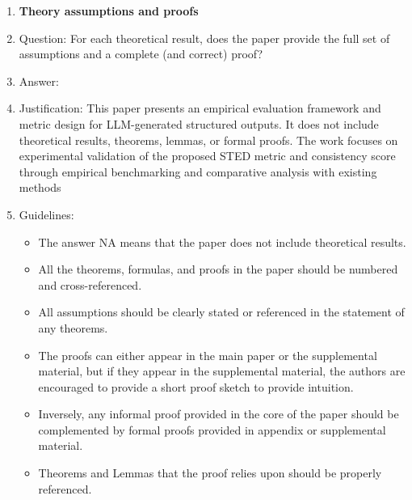 \documentclass{article}
\begin{document}
\begin{enumerate}
\item {\bf Theory assumptions and proofs}
    \item[] Question: For each theoretical result, does the paper provide the full set of assumptions and a complete (and correct) proof?
    \item[] Answer: \answerNA{} %
    \item[] Justification: \justification This paper presents an empirical evaluation framework and metric design for LLM-generated structured outputs. It does not include theoretical results, theorems, lemmas, or formal proofs. The work focuses on experimental validation of the proposed STED metric and consistency score through empirical benchmarking and comparative analysis with existing methods{}
    \item[] Guidelines:
    \begin{itemize}
        \item The answer NA means that the paper does not include theoretical results. 
        \item All the theorems, formulas, and proofs in the paper should be numbered and cross-referenced.
        \item All assumptions should be clearly stated or referenced in the statement of any theorems.
        \item The proofs can either appear in the main paper or the supplemental material, but if they appear in the supplemental material, the authors are encouraged to provide a short proof sketch to provide intuition. 
        \item Inversely, any informal proof provided in the core of the paper should be complemented by formal proofs provided in appendix or supplemental material.
        \item Theorems and Lemmas that the proof relies upon should be properly referenced. 
    \end{itemize}


\end{enumerate}
\end{document}
